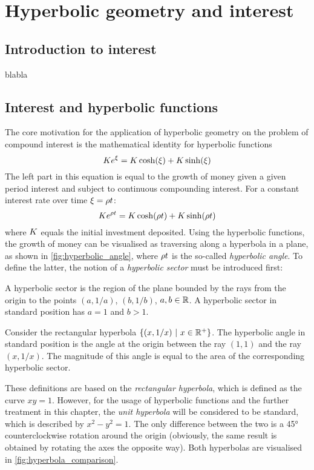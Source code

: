 \chapter{Hyperbolic geometry and interest}

\section{Introduction to interest}
blabla

\section{Interest and hyperbolic functions}
The core motivation for the application of hyperbolic geometry on the problem of compound interest is the mathematical identity for hyperbolic functions
\begin{equation}
    K e^{\xi} = K\cosh(\xi) + K\sinh(\xi)
    \label{eq:sinhcosh}
\end{equation}
The left part in this equation is equal to the growth of money given a given period interest \han and subject to continuous compounding interest. For a constant interest rate over time $\xi = \rho t$:
\begin{equation}
    K e^{\rho t} = K\cosh(\rho t) + K\sinh(\rho t)
\end{equation}
where $K$ equals the initial investment deposited. Using the hyperbolic functions, the growth of money can be visualised as traversing along a hyperbola in a plane, as shown in \cref{fig:hyperbolic_angle}, where $\rho t$ is the so-called \textit{hyperbolic angle}. To define the latter, the notion of a \textit{hyperbolic sector} must be introduced first:

\begin{definition}
    A hyperbolic sector is the region of the plane bounded by the rays from the origin to the points $(a, 1/a)$, $(b, 1/b)$, $a, b \in \mathbb{R}$. A hyperbolic sector in standard position has $a = 1$ and $b > 1$. 
    
\end{definition}

\begin{definition}
    Consider the rectangular hyperbola $\{(x, 1/x)\ \vert\ x \in \mathbb{R}^+\}$. The hyperbolic angle in standard position is the angle at the origin between the ray $(1, 1)$ and the ray $(x, 1/x)$. The magnitude of this angle is equal to the area of the corresponding hyperbolic sector.
\end{definition}
These definitions are based on the \textit{rectangular hyperbola}, which is defined as the curve $xy = 1$. However, for the usage of hyperbolic functions and the further treatment in this chapter, the \textit{unit hyperbola} will be considered to be standard, which is described by $x^2 - y^2 = 1$. The only difference between the two is a \ang{45} counterclockwise rotation around the origin (obviously, the same result is obtained by rotating the axes the opposite way). Both hyperbolas are visualised in \cref{fig:hyperbola_comparison}.

